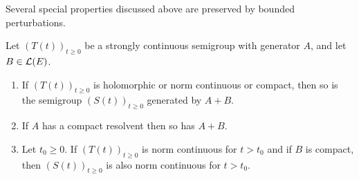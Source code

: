 Several special properties discussed above are preserved by bounded perturbations.
\begin{theorem} \label{thm:a2-1.30}
Let $(T(t))_{t \geq 0}$ be a strongly continuous semigroup with generator $A$, and let $B \in \mathcal{L}(E)$.
\begin{enumerate}[\upshape(i)]
\item
If\/ $(T(t))_{t \geq 0}$ is holomorphic or norm continuous or compact, then so is the semigroup 
$(S(t))_{t \geq 0}$ 
generated by $A+B$.

\item
If\/ $A$ has a compact resolvent then so has $A+B$.

\item
Let $t_{0} \geq 0$.
If\/ $(T(t))_{t \geq 0}$ is norm continuous for $t > t_{0}$ and if 
$B$ is compact, then $(S(t))_{t \geq 0}$ is also norm continuous for $t > t_{0}$.

\end{enumerate}
\end{theorem}
